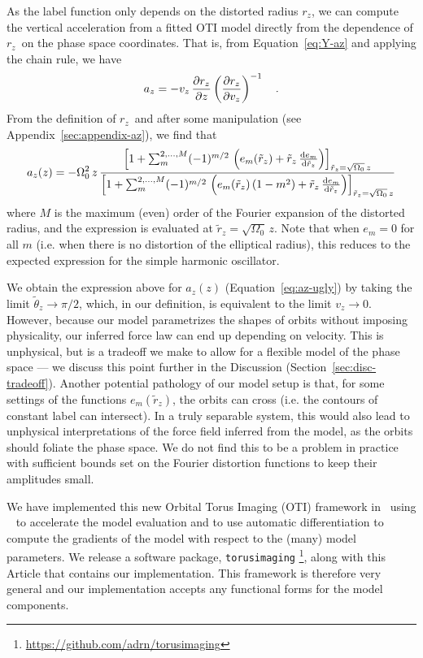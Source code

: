 \documentclass[modern]{aastex631}
\newcommand{\freqzero}{\ensuremath{\Omega_0}}
\newcommand{\mmax}{\ensuremath{M}}
\newcommand{\rz}{\ensuremath{r_z}}
\newcommand{\rzp}{\ensuremath{\tilde{r}_z}}
\newcommand{\thzp}{\ensuremath{\tilde{\theta}_z}}
\begin{document}
As the label function only depends on the distorted radius \rz, we can compute the
vertical acceleration from a fitted OTI model directly from the dependence of \rz\ on
the phase space coordinates.
That is, from Equation~\ref{eq:Y-az} and applying the chain rule, we have
\begin{equation}
    a_z = - v_z \, \frac{\partial {r_z}}{\partial {z}} \left(\frac{\partial {r_z}}{\partial {v_z}}\right)^{-1} \quad .
    \label{eq:az-rz}
\end{equation}
From the definition of \rz\ and after some manipulation (see
Appendix~\ref{sec:appendix-az}), we find that
\begin{equation}
    a_z(z) = - \freqzero^2 \, z \,
    \frac{\left[
        1 + \sum_{m}^{{2, \dots, \mmax}} (-1)^{m/2} \,
            \left(e_m(\rzp) + \rzp \, \deriv{e_m}{\rzp}\right)
    \right]_{\rzp = \sqrt{\freqzero}\,z}}{\left[
        1 + \sum_{m}^{{2, \dots, \mmax}} (-1)^{m/2} \,
            \left(e_m(\rzp) \, (1 - m^2) + \rzp \, \deriv{e_m}{\rzp}\right)
    \right]_{\rzp = \sqrt{\freqzero}\,z}} \label{eq:az-ugly}
\end{equation}
where $\mmax$ is the maximum (even) order of the Fourier expansion of the distorted
radius, and the expression is evaluated at $\rzp = \sqrt{\freqzero}\,z$.
Note that when $e_m = 0$ for all $m$ (i.e. when there is no distortion of the
elliptical radius), this reduces to the expected expression for the simple harmonic
oscillator.

We obtain the expression above for $a_z(z)$ (Equation~\ref{eq:az-ugly}) by taking the
limit $\thzp \rightarrow \pi/2$, which, in our definition, is equivalent to the limit
$v_z \rightarrow 0$.
However, because our model parametrizes the shapes of orbits without imposing
physicality, our inferred force law can end up depending on velocity.
This is unphysical, but is a tradeoff we make to allow for a flexible model of the phase
space --- we discuss this point further in the Discussion
(Section~\ref{sec:disc-tradeoff}).
Another potential pathology of our model setup is that, for some settings of the
functions $e_m(\rzp)$, the orbits can cross (i.e. the contours of constant label can
intersect).
In a truly separable system, this would also lead to unphysical interpretations of the
force field inferred from the model, as the orbits should foliate the phase space.
We do not find this to be a problem in practice with sufficient bounds set on the
Fourier distortion functions to keep their amplitudes small.

We have implemented this new Orbital Torus Imaging (OTI) framework in \python\ using
\jax\ \citep{jax:2018} to accelerate the model evaluation and to use automatic
differentiation to compute the gradients of the model with respect to the (many) model
parameters.
We release a software package, \texttt{torusimaging}
\citep{torusimaging:zenodo}\footnote{\url{https://github.com/adrn/torusimaging}}, along
with this Article that contains our implementation.
This framework is therefore very general and our implementation accepts any functional
forms for the model components.
\end{document}
